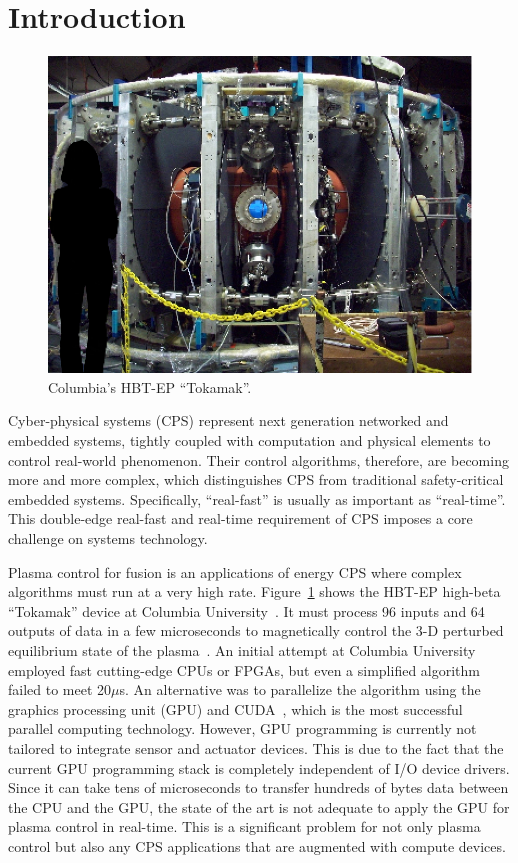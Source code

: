 \section{Introduction}
\label{sec:introduction}

\begin{figure}[t]
 \centering
 \includegraphics[width=0.79\hsize]{eps/tokamak.eps}
 \caption{Columbia's HBT-EP ``Tokamak''.}
 \label{fig:tokamak}
\end{figure}

Cyber-physical systems (CPS) represent next generation networked and
embedded systems, tightly coupled with computation and physical
elements to control real-world phenomenon.
Their control algorithms, therefore, are becoming more and more complex,
which distinguishes CPS from traditional safety-critical embedded
systems.
Specifically, ``real-fast'' is usually as important as ``real-time''.
This double-edge real-fast and real-time requirement of CPS imposes a
core challenge on systems technology.

Plasma control for fusion is an applications of energy CPS where
complex algorithms must run at a very high rate.
Figure~\ref{fig:tokamak} shows the HBT-EP high-beta ``Tokamak'' device at
Columbia University~\cite{Maurer_PPCF11,Rath_FED12}.
It must process 96 inputs and 64 outputs of data in a few microseconds
to magnetically control the 3-D perturbed equilibrium state of the
plasma~\cite{Boozer_PP99}.
An initial attempt at Columbia University employed fast cutting-edge
CPUs or FPGAs, but even a simplified algorithm failed to meet 20$\mu$s.
An alternative was to parallelize the algorithm using the
graphics processing unit (GPU) and CUDA~\cite{CUDA}, which is the most
successful parallel computing technology.
However, GPU programming is currently not tailored to integrate
sensor and actuator devices.
This is due to the fact that the current GPU programming stack is
completely independent of I/O device drivers.
Since it can take tens of microseconds to transfer hundreds of bytes
data between the CPU and the GPU, the state of the art is not adequate
to apply the GPU for plasma control in real-time.
This is a significant problem for not only plasma control but also any
CPS applications that are augmented with compute devices.

